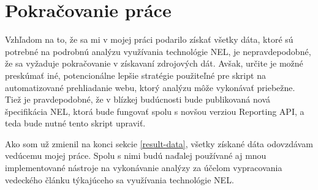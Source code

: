 \section{Pokračovanie práce}

Vzhľadom na to, že sa mi v mojej práci podarilo získať všetky dáta, ktoré sú potrebné na podrobnú analýzu využívania technológie NEL, je nepravdepodobné, že sa vyžaduje pokračovanie v získavaní zdrojových dát.
Avšak, určite je možné preskúmať iné, potencionálne lepšie stratégie použiteľné pre skript na automatizované prehliadanie webu, ktorý analýzu môže vykonávať priebežne.
Tiež je pravdepodobné, že v blízkej budúcnosti bude publikovaná nová špecifikácia NEL, ktorá bude fungovať spolu s novšou verziou Reporting API, a teda bude nutné tento skript upraviť.

Ako som už zmienil na konci sekcie \ref{result-data}, všetky získané dáta odovzdávam vedúcemu mojej práce.
Spolu s nimi budú naďalej používané aj mnou implementované nástroje na vykonávanie analýzy za účelom vypracovania vedeckého článku týkajúceho sa využívania technológie NEL. 
